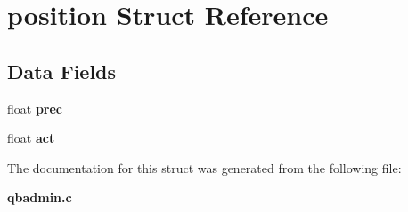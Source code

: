 \section{position Struct Reference}
\label{structposition}
\subsection*{Data Fields}
\begin{DoxyCompactItemize}
\item 
\mbox{\label{structposition_a3f6abbd70f28831ca50df1deece62d27}} 
float {\bfseries prec}
\item 
\mbox{\label{structposition_acd65ff39e6ad988e189dc854d5ede11b}} 
float {\bfseries act}
\end{DoxyCompactItemize}


The documentation for this struct was generated from the following file\+:\begin{DoxyCompactItemize}
\item 
\textbf{ qbadmin.\+c}\end{DoxyCompactItemize}
